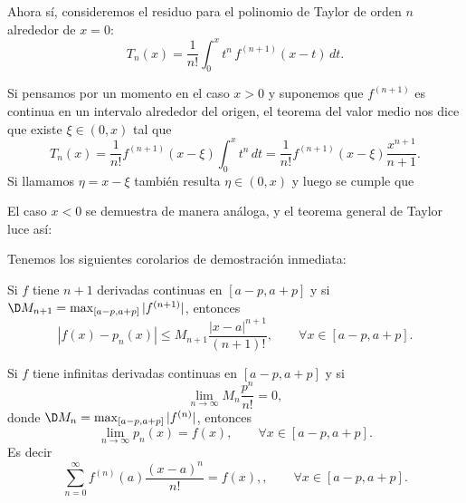 Ahora sí, consideremos el residuo para el polinomio de Taylor de orden $n$ alrededor de $x=0$:
\[
 T_n(x) = \frac{1}{n!} \int_0^x t^n \, f^{(n+1)}(x-t)\, dt.
\]

Si pensamos por un momento en el caso $x > 0$ y suponemos que $f^{(n+1)}$ es continua en un intervalo alrededor del origen, el teorema del valor medio nos dice que existe $\xi \in (0,x)$ tal que 
\[
 T_n(x) = \frac{1}{n!} f^{(n+1)}(x - \xi) \int_0^x t^n \, dt = \frac{1}{n!} f^{(n+1)}(x - \xi) \frac{x^{n+1}}{n+1}. 
\]
Si llamamos $\eta = x - \xi$ también resulta $\eta \in (0,x)$ y luego se cumple que

\caja{
\[
 T_n(x) = \frac{x^{n+1}}{(n+1)!} f^{(n+1)}(\eta),\qquad\text{para algún $\eta$ entre $0$ y $x$}.
\]
}

El caso $x<0$ se demuestra de manera análoga, y el teorema general de Taylor luce así:


Tenemos los siguientes corolarios de demostración inmediata:

\begin{corolario}
 Si $f$ tiene $n+1$ derivadas continuas en $[a-p,a+p]$ y si $\D M_{n+1} = \max_{[a-p,a+p]} |f^{(n+1)}|$, entonces
\[
 |f(x) - p_n(x) | \le M_{n+1} \frac{|x-a|^{n+1}}{(n+1)!},\qquad \forall x \in [a-p,a+p].
\]
\end{corolario}

\begin{corolario}
 Si $f$ tiene infinitas derivadas continuas en $[a-p,a+p]$ y si 
\[
 \lim_{n\to\infty} M_n \frac{p^n}{n!} = 0,
\]
donde $\D M_n = \max_{[a-p,a+p]} |f^{(n)}|$, entonces
\[
\lim_{n\to\infty} p_n(x) = f(x),\qquad \forall x \in [a-p,a+p].
\]
Es decir
\[
\sum_{n=0}^\infty f^{(n)}(a) \frac{(x-a)^n}{n!} = f(x), ,\qquad \forall x \in [a-p,a+p].
\]
\end{corolario}



